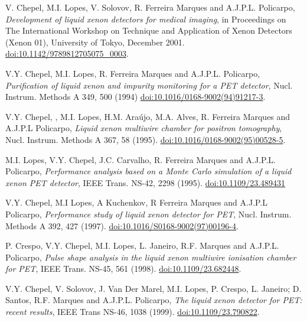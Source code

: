 \documentclass[12pt,a4paper,english,twoside]{article}
\begin{document}
\newpage\null\thispagestyle{empty}\newpage
\newpage
\begin{thebibliography}{99}
\thispagestyle{newstyle}

V. Chepel, M.I. Lopes, V. Solovov, R. Ferreira Marques and A.J.P.L. Policarpo, {\em Development of liquid xenon detectors for medical imaging}, in Proceedings on The International Workshop on Technique and Application of Xenon Detectors (Xenon 01), University of Tokyo, December 2001. \href{http://doi.org/10.1142/9789812705075\_0003}{doi:10.1142/9789812705075\_0003}.

V.Y. Chepel, M.I. Lopes, R. Ferreira Marques and A.J.P.L. Policarpo, {\em Purification of liquid xenon and impurity monitoring for a PET detector}, Nucl. Instrum. Methods A 349, 500 (1994) \href{http://doi.org/10.1016/0168-9002(94)91217-3}{doi:10.1016/0168-9002(94)91217-3}.

V.Y. Chepel, , M.I. Lopes, H.M. Araújo, M.A. Alves, R. Ferreira Marques and A.J.P.L Policarpo, {\em Liquid xenon multiwire chamber for positron tomography}, Nucl. Instrum. Methods A 367, 58 (1995). \href{http://doi.org/10.1016/0168-9002(95)00528-5}{doi:10.1016/0168-9002(95)00528-5}.

M.I. Lopes, V.Y. Chepel, J.C. Carvalho, R. Ferreira Marques and A.J.P.L. Policarpo, {\em Performance analysis based on a Monte Carlo simulation of a liquid xenon PET detector}, IEEE Trans. NS-42, 2298 (1995). \href{http://dx.doi.org/10.1109/23.489431}{doi:10.1109/23.489431}

V.Y. Chepel, M.I Lopes, A Kuchenkov, R Ferreira Marques and A.J.P.L Policarpo, {\em Performance study of liquid xenon detector for PET}, Nucl. Instrum. Methods A 392, 427 (1997). \href{http://doi.org/10.1016/S0168-9002(97)00196-4}{doi:10.1016/S0168-9002(97)00196-4}.

P. Crespo, V.Y. Chepel, M.I. Lopes, L. Janeiro, R.F. Marques and A.J.P.L. Policarpo, {\em Pulse shape analysis in the liquid xenon multiwire ionisation chamber for PET}, IEEE Trans. NS-45, 561 (1998). \href{http://doi.org/10.1109/23.682448 }{doi:10.1109/23.682448}.

V.Y. Chepel, V. Solovov, J. Van Der Marel, M.I. Lopes, P. Crespo, L. Janeiro; D. Santos, R.F. Marques and A.J.P.L. Policarpo, {\em The liquid xenon detector for PET: recent results}, IEEE Trans NS-46, 1038 (1999). \href{http://dx.doi.org/10.1109/23.790822}{doi:10.1109/23.790822}.


\end{thebibliography}
\end{document}
